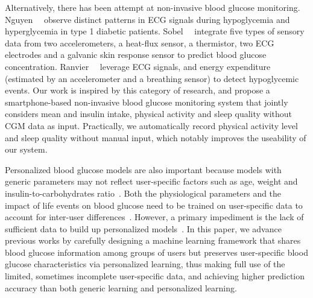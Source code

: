 Alternatively, there has been attempt at non-invasive blood glucose monitoring.
Nguyen~\etal~\cite{bib:EMBC12:Nguyen} observe distinct patterns in ECG signals during hypoglycemia and hyperglycemia in type 1 diabetic patients. 
Sobel~\etal~\cite{bib:JDST14:Sobel} integrate five types of sensory data from two accelerometers, a heat-flux sensor, a thermistor, two ECG electrodes and a galvanic skin response sensor to predict blood glucose concentration.
Ranvier~\etal~\cite{bib:SEMPER16:Ranvier} leverage ECG signals, and energy expenditure (estimated by an accelerometer and a breathing sensor) to detect hypoglycemic events.
Our work is inspired by this category of research, and propose a smartphone-based non-invasive blood glucose monitoring system that jointly considers mean and insulin intake, physical activity and sleep quality without CGM data as input.
Practically, we automatically record physical activity level and sleep quality without manual input, which notably improves the useability of our system.



Personalized blood glucose models are also important because models with generic parameters may not reflect user-specific factors such as age, weight and insulin-to-carbohydrates ratio~\cite{bib:IJNMBE16:Oviedo}.
Both the physiological parameters and the impact of life events on blood glucose need to be trained on user-specific data to account for inter-user differences~\cite{bib:ICMLA13:Bunescu}.
However, a primary impediment is the lack of sufficient data to build up personalized models~\cite{bib:KDHealth16:Marling}.
In this paper, we advance previous works by carefully designing a machine learning framework that shares blood glucose information among groups of users but preserves user-specific blood glucose characteristics via personalized learning, thus making full use of the limited, sometimes incomplete user-specific data, and achieving higher prediction accuracy than both generic learning and personalized learning.


